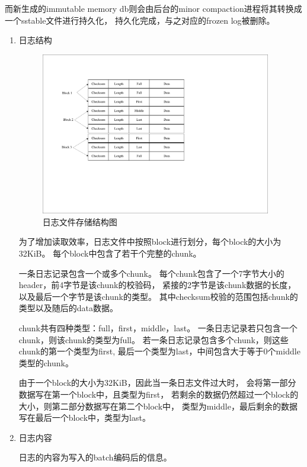 		而新生成的immutable memory db则会由后台的minor compaction进程将其转换成一个sstable文件进行持久化，
		持久化完成，与之对应的frozen log被删除。
    
		\begin{enumerate}
		\item 日志结构

		\begin{figure}[H]
			\centering
			\includegraphics[width=0.95\textwidth]{pdf/journal.pdf}
			\caption{日志文件存储结构图}
			\label{journal}
		\end{figure}
		为了增加读取效率，日志文件中按照block进行划分，每个block的大小为32KiB。
		每个block中包含了若干个完整的chunk。
		
		一条日志记录包含一个或多个chunk。
		每个chunk包含了一个7字节大小的header，前4字节是该chunk的校验码，
		紧接的2字节是该chunk数据的长度，以及最后一个字节是该chunk的类型。
		其中checksum校验的范围包括chunk的类型以及随后的data数据。
	
		chunk共有四种类型：full，first，middle，last。
		一条日志记录若只包含一个chunk，则该chunk的类型为full。
		若一条日志记录包含多个chunk，则这些chunk的第一个类型为first, 
		最后一个类型为last，中间包含大于等于0个middle类型的chunk。
		
		由于一个block的大小为32KiB，因此当一条日志文件过大时，
		会将第一部分数据写在第一个block中，且类型为first，
		若剩余的数据仍然超过一个block的大小，则第二部分数据写在第二个block中，
		类型为middle，最后剩余的数据写在最后一个block中，类型为last。
		
		\item 日志内容
		
		日志的内容为写入的batch编码后的信息。


\end{enumerate}
